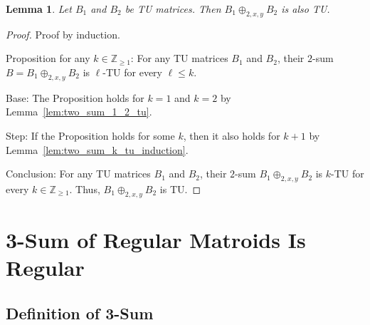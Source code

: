 \documentclass{article}
\newtheorem{lemma}{Lemma}
\theoremstyle{definition}
\begin{document}
\begin{lemma}\label{lem:two_sum_tu}
    Let $B_{1}$ and $B_{2}$ be TU matrices. Then $B_{1} \oplus_{2, x, y} B_{2}$ is also TU.
\end{lemma}

\begin{proof}
    Proof by induction.

    Proposition for any $k \in \mathbb{Z}_{\geq 1}$: For any TU matrices $B_{1}$ and $B_{2}$, their $2$-sum $B = B_{1} \oplus_{2, x, y} B_{2}$ is $\ell$-TU for every $\ell \leq k$.

    Base: The Proposition holds for $k = 1$ and $k = 2$ by Lemma~\ref{lem:two_sum_1_2_tu}.

    Step: If the Proposition holds for some $k$, then it also holds for $k + 1$ by Lemma~\ref{lem:two_sum_k_tu_induction}.

    Conclusion: For any TU matrices $B_{1}$ and $B_{2}$, their $2$-sum $B_{1} \oplus_{2, x, y} B_{2}$ is $k$-TU for every $k \in \mathbb{Z}_{\geq 1}$. Thus, $B_{1} \oplus_{2, x, y} B_{2}$ is TU.
\end{proof}

\newpage
\section{3-Sum of Regular Matroids Is Regular}

\subsection{Definition of 3-Sum}
\end{document}
